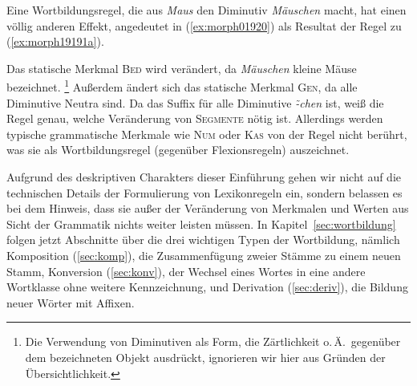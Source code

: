 \begin{exe}
\end{exe}

Eine Wortbildungsregel, die \zB aus \textit{Maus} den Diminutiv \textit{Mäuschen} macht, hat einen völlig anderen Effekt, angedeutet in (\ref{ex:morph01920}) als Resultat der Regel zu (\ref{ex:morph19191a}).

\begin{exe}
\end{exe}

Das statische Merkmal \textsc{Bed} wird verändert, da \textit{Mäuschen} kleine Mäuse bezeichnet.%
\footnote{Die Verwendung von Diminutiven als Form, die Zärtlichkeit o.\,Ä.\ gegenüber dem bezeichneten Objekt ausdrückt, ignorieren wir hier aus Gründen der Übersichtlichkeit.}
Außerdem ändert sich das statische Merkmal \textsc{Gen}, da alle Diminutive Neutra sind.
Da das Suffix für alle Diminutive \mbox{\textit{\~-chen}} ist, weiß die Regel genau, welche Veränderung von \textsc{Segmente} nötig ist.
Allerdings werden typische grammatische Merkmale wie \textsc{Num} oder \textsc{Kas} von der Regel nicht berührt, was sie als Wortbildungsregel (gegenüber Flexionsregeln) auszeichnet.

Aufgrund des deskriptiven Charakters dieser Einführung gehen wir nicht auf die technischen Details der Formulierung von Lexikonregeln ein, sondern belassen es bei dem Hinweis, dass sie außer der Veränderung von Merkmalen und Werten aus Sicht der Grammatik nichts weiter leisten müssen.
In Kapitel~\ref{sec:wortbildung} folgen jetzt Abschnitte über die drei wichtigen Typen der Wortbildung, nämlich Komposition (\ref{sec:komp}), die Zusammenfügung zweier Stämme zu einem neuen Stamm, Konversion (\ref{sec:konv}), der Wechsel eines Wortes in eine andere Wortklasse ohne weitere Kennzeichnung, und Derivation (\ref{sec:deriv}), die Bildung neuer Wörter mit Affixen.

\Zusammenfassung

